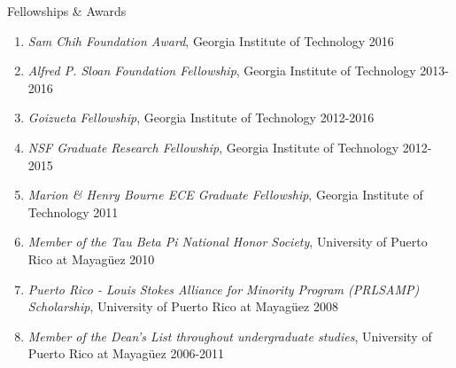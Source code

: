 \documentclass{resume} %
\newcommand{\sectionspace}{\vspace{3mm}}
\newcommand{\simplelistentry}[3]{\textit{#1}, {#2} \hfill {#3}}
\newcommand{\fixme}{\textcolor{red}{\textbf{fix me}} \space}
\newcommand{\attention}[1]{\noindent \fixme \textcolor{red}{#1}}
\begin{document}
\iffalse
\sectionspace
\begin{rSection}{Invited Talks \& Demonstrations}

\begin{enumerate}
\item one
\end{enumerate}


\end{rSection}
\fi






\sectionspace

\begin{rSection}{Fellowships \& Awards}

\begin{enumerate}


\item \simplelistentry{Sam Chih Foundation Award}{Georgia Institute of
    Technology}{2016}

\item \simplelistentry{Alfred P. Sloan Foundation Fellowship}{Georgia Institute
    of Technology}{2013-2016}

\item \simplelistentry{Goizueta Fellowship}{Georgia Institute of
    Technology}{2012-2016}

\item \simplelistentry{NSF Graduate Research Fellowship}{Georgia Institute of
    Technology}{2012-2015}

\item \simplelistentry{Marion \& Henry Bourne ECE Graduate Fellowship}{Georgia
    Institute of Technology}{2011}

\item \simplelistentry{Member of the Tau Beta Pi National Honor
    Society}{University of Puerto Rico at Mayag\"{u}ez}{2010}

\item \simplelistentry{Puerto Rico - Louis Stokes Alliance for Minority Program
    (PRLSAMP) Scholarship}{University of Puerto Rico at Mayag\"{u}ez}{2008}

\item \simplelistentry{Member of the Dean's List throughout undergraduate
    studies}{University of Puerto Rico at Mayag\"{u}ez}{2006-2011}

\end{enumerate}

\end{rSection}
\end{document}
